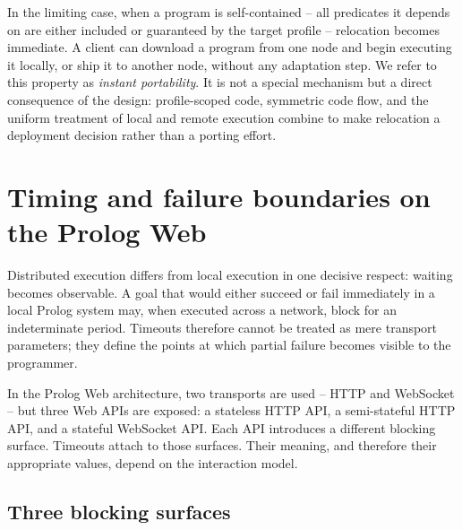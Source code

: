 In the limiting case, when a program is self-contained -- all predicates it depends on are either included or guaranteed by the target profile -- relocation becomes immediate. A client can download a program from one node and begin executing it locally, or ship it to another node, without any adaptation step. We refer to this property as \emph{instant portability}. It is not a special mechanism but a direct consequence of the design: profile-scoped code, symmetric code flow, and the uniform treatment of local and remote execution combine to make relocation a deployment decision rather than a porting effort.


\section{Timing and failure boundaries on the Prolog Web}
\label{sec:timing-failure-boundaries}

\noindent Distributed execution differs from local execution in one
decisive respect: waiting becomes observable. A goal that would
either succeed or fail immediately in a local Prolog system may,
when executed across a network, block for an indeterminate period.
Timeouts therefore cannot be treated as mere transport parameters;
they define the points at which partial failure becomes visible to
the programmer.

In the Prolog Web architecture, two transports are used -- HTTP and
WebSocket -- but three Web APIs are exposed: a stateless HTTP API, a
semi-stateful HTTP API, and a stateful WebSocket API. Each API
introduces a different blocking surface. Timeouts attach to those
surfaces. Their meaning, and therefore their appropriate values,
depend on the interaction model.


\subsection{Three blocking surfaces}

